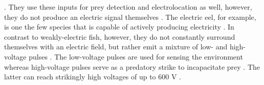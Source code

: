 \parencite{kalmijn1971electric}. They use these inputs for prey detection and electrolocation as well, however, they do not produce an electric signal themselves \parencite{kalmijn1971electric, kalmijn1973electro}. The electric eel, for example, is one the few species that is capable of actively producing electricity \parencite{catania2014shocking}. In contrast to weakly-electric fish, however, they do not constantly surround themselves with an electric field, but rather emit a mixture of low- and high-voltage pulses \parencite{catania2014shocking, catania2015electric}. The low-voltage pulses are used for sensing the environment whereas high-voltage pulses serve as a predatory strike to incapacitate prey \parencite{brown1950electric, catania2014shocking, catania2015electric}. The latter can reach strikingly high voltages of up to 600 V \parencite{brown1950electric, catania2014shocking}.

